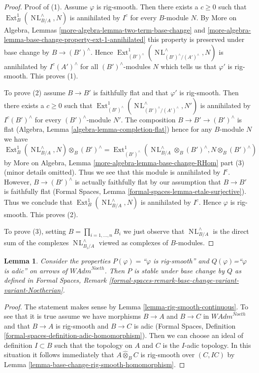 \documentclass{stacks-project}
\theoremstyle{plain}
\newtheorem{lemma}[subsection]{Lemma}
\theoremstyle{definition}
\theoremstyle{remark}
\numberwithin{equation}{subsection}
\def\Ext{\mathop{\mathrm{Ext}}\nolimits}
\def\NL{\mathop{N\!L}\nolimits}
\begin{document}
\begin{proof}
\medskip\noindent
Proof of (1). Assume $\varphi$ is rig-smooth. Then there exists a $c \geq 0$
such that $\Ext^1_B(\NL_{B/A}^\wedge, N)$ is annihilated by $I^c$
for every $B$-module $N$. By
More on Algebra, Lemmas \ref{more-algebra-lemma-two-term-base-change} and
\ref{more-algebra-lemma-base-change-property-ext-1-annihilated}
this property is preserved under base change by $B \to (B')^\wedge$.
Hence $\Ext^1_{(B')^\wedge}(\NL_{(B')^\wedge/(A')^\wedge}^\wedge, N)$
is annihilated by $I^c(A')^\wedge$ for all $(B')^\wedge$-modules $N$
which tells us that $\varphi'$ is rig-smooth.
This proves (1).

\medskip\noindent
To prove (2) assume $B \to B'$ is faithfully flat and that $\varphi'$
is rig-smooth. Then there exists a $c \geq 0$ such that
$\Ext^1_{(B')^\wedge}(\NL_{(B')^\wedge/(A')^\wedge}^\wedge, N')$
is annihilated by $I^c(B')^\wedge$ for every $(B')^\wedge$-module $N'$.
The composition $B \to B' \to (B')^\wedge$ is flat
(Algebra, Lemma \ref{algebra-lemma-completion-flat})
hence for any $B$-module $N$ we have
$$
\Ext^1_B(\NL_{B/A}^\wedge, N) \otimes_B (B')^\wedge =
\Ext^1_{(B')^\wedge}(\NL_{B/A}^\wedge \otimes_B (B')^\wedge,
N \otimes_B (B')^\wedge)
$$
by More on Algebra, Lemma \ref{more-algebra-lemma-base-change-RHom} part (3)
(minor details omitted). Thus we see that this module is annihilated
by $I^c$. However, $B \to (B')^\wedge$ is actually faithfully flat
by our assumption that $B \to B'$ is faithfully flat (Formal Spaces, Lemma
\ref{formal-spaces-lemma-etale-surjective}). Thus we conclude that
$\Ext^1_B(\NL_{B/A}^\wedge, N)$ is annihilated by $I^c$.
Hence $\varphi$ is rig-smooth. This proves (2).

\medskip\noindent
To prove (3), setting $B = \prod_{i = 1, \ldots, n} B_i$
we just observe that $\NL_{B/A}^\wedge$ is the direct
sum of the complexes $\NL_{B_i/A}^\wedge$ viewed as complexes
of $B$-modules.
\end{proof}

\begin{lemma}
\label{lemma-base-change-rig-smooth-continuous}
Consider the properties $P(\varphi)=$``$\varphi$ is rig-smooth''
and $Q(\varphi)$=``$\varphi$ is adic'' on arrows of $\textit{WAdm}^{Noeth}$.
Then $P$ is stable under base change by $Q$ as defined in
Formal Spaces, Remark
\ref{formal-spaces-remark-base-change-variant-variant-Noetherian}.
\end{lemma}

\begin{proof}
The statement makes sense by Lemma \ref{lemma-rig-smooth-continuous}.
To see that it is true assume we have morphisms
$B \to A$ and $B \to C$ in $\textit{WAdm}^{Noeth}$
and that $B \to A$ is rig-smooth and $B \to C$ is adic
(Formal Spaces, Definition
\ref{formal-spaces-definition-adic-homomorphism}).
Then we can choose an ideal of definition $I \subset B$
such that the topology on $A$ and $C$ is the $I$-adic topology.
In this situation it follows immediately that
$A \widehat{\otimes}_B C$ is rig-smooth over $(C, IC)$ by
Lemma \ref{lemma-base-change-rig-smooth-homomorphism}.
\end{proof}
\end{document}
